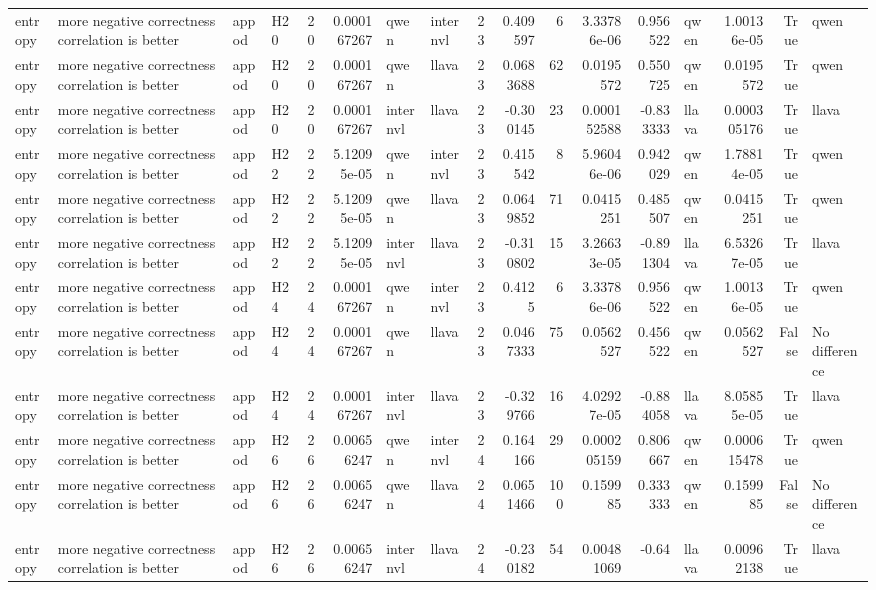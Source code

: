 \begin{longtable}{llllrrllrrrrrlrrl}
entropy & more negative correctness correlation is better & appod & H20 & 20 & 0.000167267 & qwen & internvl & 23 & 0.409597 & 6 & 3.33786e-06 & 0.956522 & qwen & 1.00136e-05 & True & qwen \\
entropy & more negative correctness correlation is better & appod & H20 & 20 & 0.000167267 & qwen & llava & 23 & 0.0683688 & 62 & 0.0195572 & 0.550725 & qwen & 0.0195572 & True & qwen \\
entropy & more negative correctness correlation is better & appod & H20 & 20 & 0.000167267 & internvl & llava & 23 & -0.300145 & 23 & 0.000152588 & -0.833333 & llava & 0.000305176 & True & llava \\
entropy & more negative correctness correlation is better & appod & H22 & 22 & 5.12095e-05 & qwen & internvl & 23 & 0.415542 & 8 & 5.96046e-06 & 0.942029 & qwen & 1.78814e-05 & True & qwen \\
entropy & more negative correctness correlation is better & appod & H22 & 22 & 5.12095e-05 & qwen & llava & 23 & 0.0649852 & 71 & 0.0415251 & 0.485507 & qwen & 0.0415251 & True & qwen \\
entropy & more negative correctness correlation is better & appod & H22 & 22 & 5.12095e-05 & internvl & llava & 23 & -0.310802 & 15 & 3.26633e-05 & -0.891304 & llava & 6.53267e-05 & True & llava \\
entropy & more negative correctness correlation is better & appod & H24 & 24 & 0.000167267 & qwen & internvl & 23 & 0.4125 & 6 & 3.33786e-06 & 0.956522 & qwen & 1.00136e-05 & True & qwen \\
entropy & more negative correctness correlation is better & appod & H24 & 24 & 0.000167267 & qwen & llava & 23 & 0.0467333 & 75 & 0.0562527 & 0.456522 & qwen & 0.0562527 & False & No difference \\
entropy & more negative correctness correlation is better & appod & H24 & 24 & 0.000167267 & internvl & llava & 23 & -0.329766 & 16 & 4.02927e-05 & -0.884058 & llava & 8.05855e-05 & True & llava \\
entropy & more negative correctness correlation is better & appod & H26 & 26 & 0.00656247 & qwen & internvl & 24 & 0.164166 & 29 & 0.000205159 & 0.806667 & qwen & 0.000615478 & True & qwen \\
entropy & more negative correctness correlation is better & appod & H26 & 26 & 0.00656247 & qwen & llava & 24 & 0.0651466 & 100 & 0.159985 & 0.333333 & qwen & 0.159985 & False & No difference \\
entropy & more negative correctness correlation is better & appod & H26 & 26 & 0.00656247 & internvl & llava & 24 & -0.230182 & 54 & 0.00481069 & -0.64 & llava & 0.00962138 & True & llava \\

\end{longtable}
